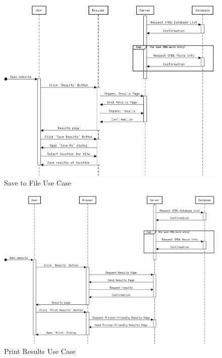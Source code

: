 \documentclass{article}
\begin{document}
\begin{figure}[]
\includegraphics[width=\columnwidth]{res/sequence_diagram4.png}
\caption{Save to File Use Case}
\end{figure}


\begin{figure}[]
\includegraphics[width=\columnwidth]{res/sequence_diagram5.png}
\caption{Print Results Use Case}
\end{figure}
\end{document}
